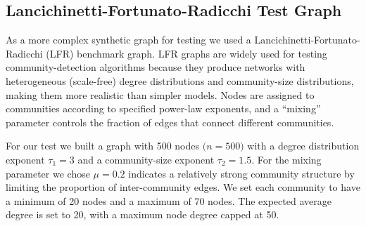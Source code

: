 \subsection{Lancichinetti-Fortunato-Radicchi Test Graph}
As a more complex synthetic graph for testing we used a Lancichinetti-Fortunato-Radicchi (LFR) benchmark graph. LFR graphs are widely used for testing community-detection algorithms because they produce networks with heterogeneous (scale-free) degree distributions and community-size distributions, making them more realistic than simpler models. Nodes are assigned to communities according to specified power-law exponents, and a “mixing” parameter controls the fraction of edges that connect different communities.

For our test we built a graph with 500 nodes \(\bigl(n = 500\bigr)\) with a degree distribution exponent \(\tau_{1} = 3\) and a community-size exponent \(\tau_{2} = 1.5\). For the mixing parameter we chose \(\mu = 0.2\) indicates a relatively strong community structure by limiting the proportion of inter-community edges. We set each community to have a minimum of 20 nodes and a maximum of 70 nodes. The expected average degree is set to 20, with a maximum node degree capped at 50. 

